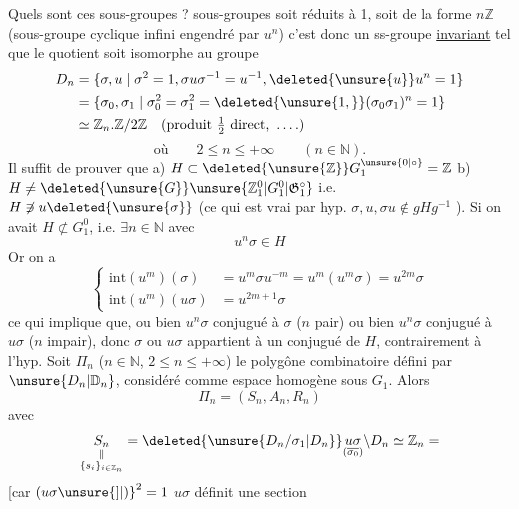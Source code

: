 Quels sont ces sous-groupes  ?  
 sous-groupes  soit réduits
à 1, soit de la forme $n\mathbb Z$  (sous-groupe cyclique
infini engendré par $u^n$)  c'est
donc un ss-groupe \uline{invariant} tel que le
quotient soit isomorphe au groupe
\[
\begin{aligned}
D_n&=\{\sigma,u\mid\sigma^2=1,\sigma u\sigma^{-1}=u^{-1},\deleted{\unsure{u}}u^n=1\}\\
&=\{\sigma_0,\sigma_1\mid\sigma_0^2=\sigma_1^2=\deleted{\unsure{1,}}(\sigma_0\sigma_1)^n=1\}\\
&\simeq \mathbb Z_n.\mathbb Z/2\mathbb Z\quad(\text{produit }\tfrac12\text{ direct, }\ldots.)
\end{aligned}
\]
\[
\text{où}\qquad 2\leq n\leq+\infty\qquad(n\in\mathbb N).
\]
Il suffit de prouver que \qquad a) $H\subset\deleted{\unsure{\mathbb Z}}G_1^{\unsure{0|\circ}}=\mathbb Z$
b) $H\ne\deleted{\unsure{G}}\unsure{\mathbb Z_1^0|G_1^0|\mathfrak G_1^\circ}$ i.e. $H\not\ni u\deleted{\unsure{\sigma}}$ (ce qui est vrai par
hyp. $\sigma,u,\sigma u\notin gHg^{-1}$ ). Si on avait $H\not\subset G_1^0$,
i.e. $\exists n\in\mathbb N$ avec
\[
u^n\sigma\in H
\]
Or on a 
\[
\left\{\begin{aligned}
\mathrm{int}(u^m)(\sigma)&=u^m\sigma u^{-m}=u^m(u^m\sigma)=u^{2m}\sigma\\
\mathrm{int}(u^m)(u\sigma)&=u^{2m+1}\sigma
\end{aligned}\right.
\]
ce qui implique que, ou bien $u^n\sigma$ conjugué
à $\sigma$ ($n$ pair) ou bien $u^n\sigma$ conjugué à $u\sigma$
($n$ impair), donc $\sigma$ ou $u\sigma$ appartient à un
conjugué de $H$, contrairement à l'hyp.
Soit $\Pi_n$ ($n\in\mathbb N$, $2\leq n\leq+\infty$) le polygône
combinatoire défini par $\unsure{D_n|\mathbb D_n}$, considéré comme
espace homogène sous $G_1$. Alors
\[
\Pi_n=(S_n,A_n,R_n)
\]
avec
\[
\underset{\substack{\Vert\\\{s_i\}_{i\in\mathbb Z_n}}}{S_n}=\deleted{\unsure{D_n/\sigma_1|D_n}}\underset{(\overline{\sigma_0})}{u\sigma}\backslash D_n\simeq\mathbb Z_n=
\]
[car $(u\sigma{\unsure{]|)}}^2=1$  $u\sigma$ définit une section
